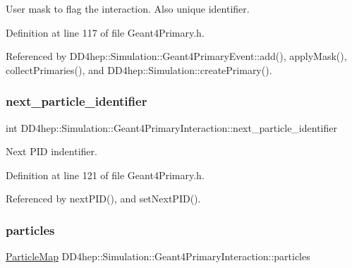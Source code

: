 User mask to flag the interaction. Also unique identifier. 



Definition at line 117 of file Geant4\+Primary.\+h.



Referenced by D\+D4hep\+::\+Simulation\+::\+Geant4\+Primary\+Event\+::add(), apply\+Mask(), collect\+Primaries(), and D\+D4hep\+::\+Simulation\+::create\+Primary().

\hypertarget{class_d_d4hep_1_1_simulation_1_1_geant4_primary_interaction_a75a39b787b9c354fd958569f316a3023}{}\label{class_d_d4hep_1_1_simulation_1_1_geant4_primary_interaction_a75a39b787b9c354fd958569f316a3023} 
\subsubsection{\texorpdfstring{next\+\_\+particle\+\_\+identifier}{next\_particle\_identifier}}
{\footnotesize\ttfamily int D\+D4hep\+::\+Simulation\+::\+Geant4\+Primary\+Interaction\+::next\+\_\+particle\+\_\+identifier}



Next P\+ID indentifier. 



Definition at line 121 of file Geant4\+Primary.\+h.



Referenced by next\+P\+I\+D(), and set\+Next\+P\+I\+D().

\hypertarget{class_d_d4hep_1_1_simulation_1_1_geant4_primary_interaction_af8c7d724dc7792108c26c6fe93d7bf61}{}\label{class_d_d4hep_1_1_simulation_1_1_geant4_primary_interaction_af8c7d724dc7792108c26c6fe93d7bf61} 
\subsubsection{\texorpdfstring{particles}{particles}}
{\footnotesize\ttfamily \hyperlink{class_d_d4hep_1_1_simulation_1_1_geant4_primary_interaction_a6787a2c42dc1fd371b274e75dc380e92}{Particle\+Map} D\+D4hep\+::\+Simulation\+::\+Geant4\+Primary\+Interaction\+::particles}



